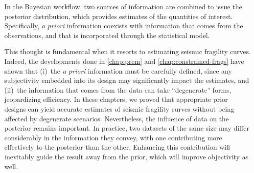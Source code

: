 In the Bayesian workflow, two sources of information are combined to issue the posterior distribution, which provides estimates of the quantities of interest. 
Specifically, \emph{a priori} information  coexists with information that comes from the observations, and that is incorporated through the statistical model.

This thought is fundamental %
when it resorts to estimating seismic fragility curves.
Indeed, the developments done in \cref{chap:prem} and \cref{chap:constrained-frags}
have shown that (i)~the \emph{a priori} information  must be carefully defined, since any  subjectivity embedded into its design may significantly impact the estimates, and (ii)~the information that comes from the data can take ``degenerate'' forms, jeopardizing efficiency.
In these chapters, we proved that appropriate prior designs can yield accurate estimates of seismic fragility curves  
without being affected by degenerate scenarios.
Nevertheless, the influence of data on the posterior remains important. %
In practice, %
two datasets of the same size may differ considerably in the information they convey, with one contributing more effectively to the posterior than the other. Enhancing this contribution will inevitably guide the result away from the prior, which will improve objectivity as well.







